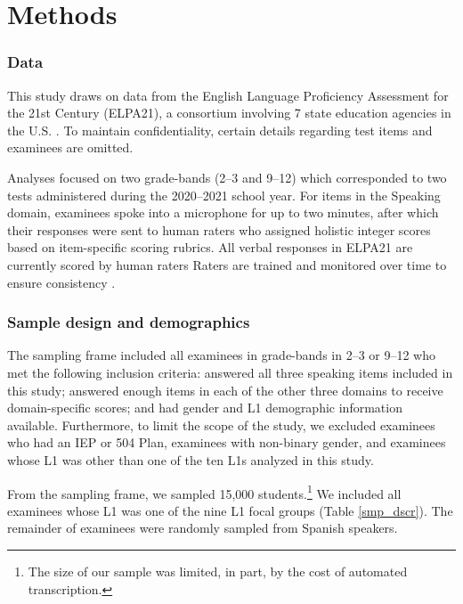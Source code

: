 \documentclass [PhD] {uclathes}
\begin{document}
\chapter{Methods}

\subsection{Data}

This study draws on data from the English Language Proficiency Assessment for the 21st Century (ELPA21), a consortium involving 7 state education agencies in the U.S. \citep{huang2018english}. To maintain confidentiality, certain details regarding test items and examinees are omitted. 

Analyses focused on two grade-bands (2–3 and 9–12) which corresponded to two tests administered during the 2020–2021 school year. For items in the Speaking domain, examinees spoke into a microphone for up to two minutes, after which their responses were sent to human raters who assigned holistic integer scores based on item-specific scoring rubrics. All verbal responses in ELPA21 are currently scored by human raters Raters are trained and monitored over time to ensure consistency \citep{engelhard2002monitoring}. 

\subsection{Sample design and demographics}

The sampling frame included all examinees in grade-bands in 2–3 or 9–12 who met the following inclusion criteria: answered all three speaking items included in this study; answered enough items in each of the other three domains to receive domain-specific scores; and had gender and L1 demographic information available. Furthermore, to limit the scope of the study, we excluded examinees who had an IEP or 504 Plan, examinees with non-binary gender, and examinees whose L1 was other than one of the ten L1s analyzed in this study. 

From the sampling frame, we sampled 15,000 students.\footnote{The size of our sample was limited, in part, by the cost of automated transcription.} We included all examinees whose L1 was one of the nine L1 focal groups (Table \ref{smp_dscr}). The remainder of examinees were randomly sampled from Spanish speakers. 
\end{document}
